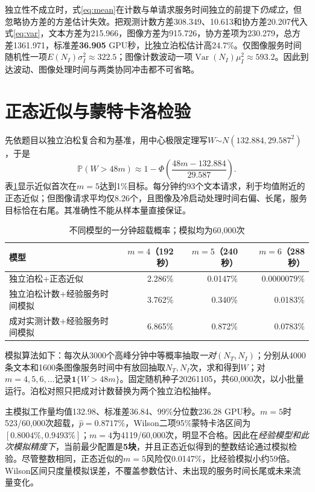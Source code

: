 \documentclass[UTF8,a4paper,11pt,fontset=fandol]{ctexart}
\numberwithin{equation}{section}
\newcommand{\pr}{\mathbb{P}}
\begin{document}
独立性不成立时，式\eqref{eq:mean}在计数与单请求服务时间独立的前提下\emph{仍成立}，但忽略协方差的方差估计失效。把观测计数方差308.349、10.613和协方差20.207代入式\eqref{eq:var}，文本方差为215.966，图像方差为915.726，协方差项为230.279，总方差1361.971，标准差\textbf{36.905} GPU秒，比独立泊松估计高24.7\%。仅图像服务时间随机性一项$E(N_I)\sigma_I^2\approx322.5$；图像计数波动一项$\operatorname{Var}(N_I)\mu_I^2\approx593.2$。因此到达波动、图像处理时间与两类协同冲击都不可省略。

\section{正态近似与蒙特卡洛检验}
先依题目以独立泊松复合和为基准，用中心极限定理写$W\dot\sim N(132.884,29.587^2)$，于是
\begin{equation}
\pr(W>48m)\approx1-\Phi\!\left(\frac{48m-132.884}{29.587}\right).
\end{equation}
表\ref{tab:normal}显示近似首次在$m=5$达到1\%目标。每分钟约93个文本请求，利于均值附近的正态近似；但图像请求平均仅8.26个，且图像及冷启动处理时间右偏、长尾，服务目标恰在右尾。其准确性不能从样本量直接保证。

\begin{table}[htbp]\centering
\caption{不同模型的一分钟超载概率；模拟均为60,000次}
\begin{tabular}{lrrr}\toprule
模型&$m=4$（192秒）&$m=5$（240秒）&$m=6$（288秒）\\\midrule
独立泊松+正态近似&2.286\%&0.0147\%&$0.0000079\%$\\
独立泊松计数+经验服务时间模拟&3.762\%&0.340\%&0.0183\%\\
成对实测计数+经验服务时间模拟&6.865\%&0.872\%&0.0783\%\\\bottomrule
\end{tabular}
\label{tab:normal}
\end{table}

模拟算法如下：每次从3000个高峰分钟中等概率抽取\emph{一对}$(N_T,N_I)$；分别从4000条文本和1600条图像服务时间中有放回抽取$N_T,N_I$次，求和得到$W$；对$m=4,5,6,\ldots$记录$\mathbf1\{W>48m\}$。固定随机种子20261105，共60,000次，以小批量运行。泊松对照只把成对计数替换为两个独立泊松抽样。

主模拟工作量均值132.98、标准差36.84、99\%分位数236.28 GPU秒。$m=5$时523/60,000次超载，$\hat p=0.8717\%$，Wilson二项95\%蒙特卡洛区间为$[0.8004\%,0.9493\%]$；$m=4$为4119/60,000次，明显不合格。因此在\emph{经验模型和此次模拟精度下}，当前最少配置是\textbf{5块}，并且正态近似得到的整数结论通过模拟检验。尽管整数相同，正态近似的$m=5$风险仅0.0147\%，比经验模拟小约59倍。Wilson区间只度量模拟误差，不覆盖参数估计、未出现的服务时间长尾或未来流量变化。
\end{document}
